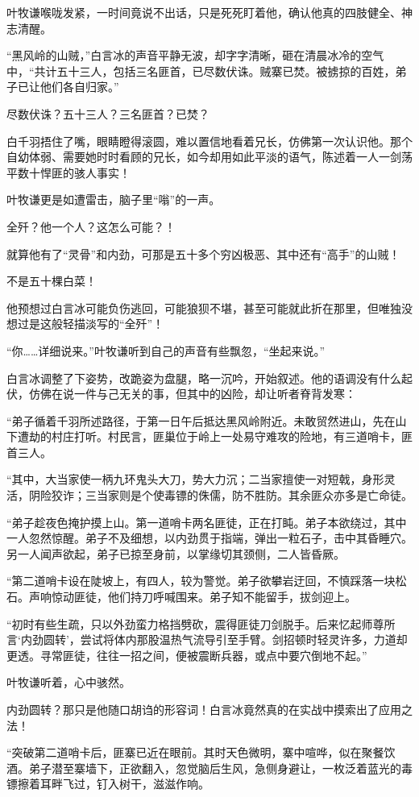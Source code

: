 叶牧谦喉咙发紧，一时间竟说不出话，只是死死盯着他，确认他真的四肢健全、神志清醒。

“黑风岭的山贼，”白言冰的声音平静无波，却字字清晰，砸在清晨冰冷的空气中，“共计五十三人，包括三名匪首，已尽数伏诛。贼寨已焚。被掳掠的百姓，弟子已让他们各自归家。”

尽数伏诛？五十三人？三名匪首？已焚？

白千羽捂住了嘴，眼睛瞪得滚圆，难以置信地看着兄长，仿佛第一次认识他。那个自幼体弱、需要她时时看顾的兄长，如今却用如此平淡的语气，陈述着一人一剑荡平数十悍匪的骇人事实！

叶牧谦更是如遭雷击，脑子里“嗡”的一声。

全歼？他一个人？这怎么可能？！

就算他有了“灵骨”和内劲，可那是五十多个穷凶极恶、其中还有“高手”的山贼！

不是五十棵白菜！

他预想过白言冰可能负伤逃回，可能狼狈不堪，甚至可能就此折在那里，但唯独没想过是这般轻描淡写的“全歼”！

“你……详细说来。”叶牧谦听到自己的声音有些飘忽，“坐起来说。”

白言冰调整了下姿势，改跪姿为盘腿，略一沉吟，开始叙述。他的语调没有什么起伏，仿佛在说一件与己无关的事，但其中的凶险，却让听者脊背发寒：

“弟子循着千羽所述路径，于第一日午后抵达黑风岭附近。未敢贸然进山，先在山下遭劫的村庄打听。村民言，匪巢位于岭上一处易守难攻的险地，有三道哨卡，匪首三人。

“其中，大当家使一柄九环鬼头大刀，势大力沉；二当家擅使一对短戟，身形灵活，阴险狡诈；三当家则是个使毒镖的侏儒，防不胜防。其余匪众亦多是亡命徒。

“弟子趁夜色掩护摸上山。第一道哨卡两名匪徒，正在打盹。弟子本欲绕过，其中一人忽然惊醒。弟子不及细想，以内劲贯于指端，弹出一粒石子，击中其昏睡穴。另一人闻声欲起，弟子已掠至身前，以掌缘切其颈侧，二人皆昏厥。

“第二道哨卡设在陡坡上，有四人，较为警觉。弟子欲攀岩迂回，不慎踩落一块松石。声响惊动匪徒，他们持刀呼喊围来。弟子知不能留手，拔剑迎上。

“初时有些生疏，只以外劲蛮力格挡劈砍，震得匪徒刀剑脱手。后来忆起师尊所言‘内劲圆转’，尝试将体内那股温热气流导引至手臂。剑招顿时轻灵许多，力道却更透。寻常匪徒，往往一招之间，便被震断兵器，或点中要穴倒地不起。”

叶牧谦听着，心中骇然。

内劲圆转？那只是他随口胡诌的形容词！白言冰竟然真的在实战中摸索出了应用之法！

“突破第二道哨卡后，匪寨已近在眼前。其时天色微明，寨中喧哗，似在聚餐饮酒。弟子潜至寨墙下，正欲翻入，忽觉脑后生风，急侧身避让，一枚泛着蓝光的毒镖擦着耳畔飞过，钉入树干，滋滋作响。

